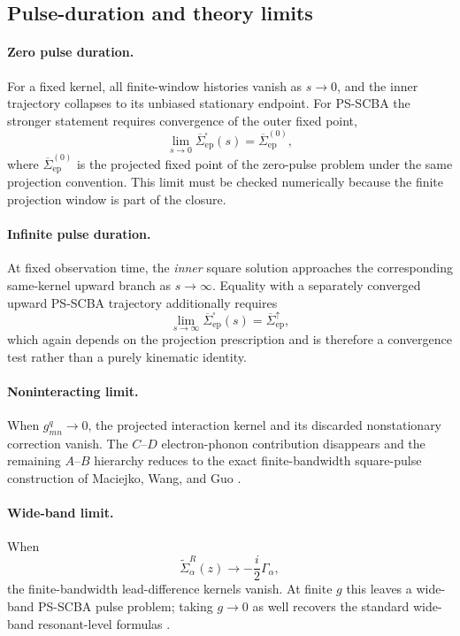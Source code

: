 \documentclass[
 reprint,
 superscriptaddress,
 amsmath,amssymb,
 aps,prb,
 longbibliography,
 floatfix
]{revtex4-2}
\newcommand{\ep}{\mathrm{ep}}
\newcommand{\barSigma}{\overline{\Sigma}}
\begin{document}
\subsection{Pulse-duration and theory limits}
\label{sec:square-limits}

\paragraph{Zero pulse duration.}
For a fixed kernel, all finite-window histories vanish as \(s\rightarrow0\), and the inner trajectory collapses to its unbiased stationary endpoint. For PS-SCBA the stronger statement requires convergence of the outer fixed point,
\begin{equation}
\lim_{s\to0}
\barSigma_{\ep}^{\square}(s)
=
\barSigma_{\ep}^{(0)},
\label{eq:square-zero-duration-kernel}
\end{equation}
where \(\barSigma_{\ep}^{(0)}\) is the projected fixed point of the zero-pulse problem under the same projection convention. This limit must be checked numerically because the finite projection window is part of the closure.

\paragraph{Infinite pulse duration.}
At fixed observation time, the \emph{inner} square solution approaches the corresponding same-kernel upward branch as \(s\to\infty\). Equality with a separately converged upward PS-SCBA trajectory additionally requires
\begin{equation}
\lim_{s\to\infty}
\barSigma_{\ep}^{\square}(s)
=
\barSigma_{\ep}^{\uparrow},
\label{eq:square-infinite-duration-kernel}
\end{equation}
which again depends on the projection prescription and is therefore a convergence test rather than a purely kinematic identity.

\paragraph{Noninteracting limit.}
When \(g_{mn}^q\to0\), the projected interaction kernel and its discarded nonstationary correction vanish. The \(C\)--\(D\) electron-phonon contribution disappears and the remaining \(A\)--\(B\) hierarchy reduces to the exact finite-bandwidth square-pulse construction of Maciejko, Wang, and Guo \cite{MaciejkoWangGuo2006}.

\paragraph{Wide-band limit.}
When
\begin{equation*}
\widetilde\Sigma_\alpha^R(z)
\rightarrow
-\frac{i}{2}\Gamma_\alpha,
\end{equation*}
the finite-bandwidth lead-difference kernels vanish. At finite \(g\) this leaves a wide-band PS-SCBA pulse problem; taking \(g\to0\) as well recovers the standard wide-band resonant-level formulas \cite{WingreenJauhoMeir1993,JauhoWingreenMeir1994}.
\end{document}

